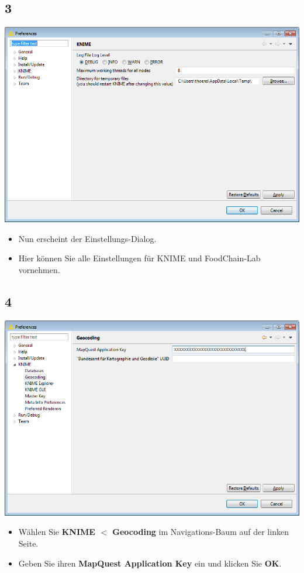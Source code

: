 \documentclass{beamer}
\begin{document}
\subsection{3}
\begin{frame}
	\begin{center}
  		\includegraphics[height=0.6\textheight]{3.png}
	\end{center}
	\begin{itemize}
		\item Nun erscheint der Einstellungs-Dialog.
		\item Hier können Sie alle Einstellungen für KNIME und FoodChain-Lab vornehmen.
	\end{itemize}
\end{frame}

\subsection{4}
\begin{frame}
	\begin{center}
  		\includegraphics[height=0.6\textheight]{4.png}
	\end{center}
	\begin{itemize}
		\item Wählen Sie \textbf{KNIME $<$ Geocoding} im Navigations-Baum auf der linken Seite.
		\item Geben Sie ihren \textbf{MapQuest Application Key} ein und klicken Sie \textbf{OK}.
	\end{itemize}
\end{frame}
\end{document}
